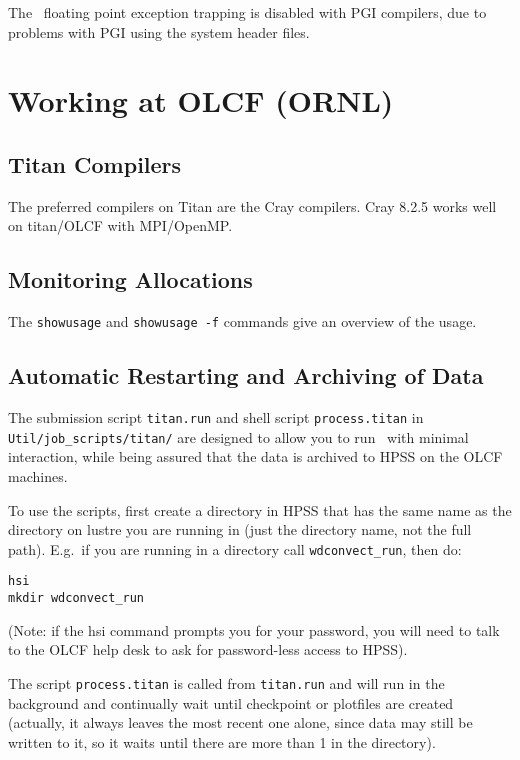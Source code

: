 The \boxlib\ floating point exception trapping is disabled with PGI compilers, due to 
problems with PGI using the system header files.



\section{Working at OLCF (ORNL)}

\subsection{Titan Compilers}

The preferred compilers on Titan are the Cray compilers.  
Cray 8.2.5 works well on titan/OLCF with MPI/OpenMP.


\subsection{Monitoring Allocations}

The {\tt showusage} and {\tt showusage -f} commands give an
overview of the usage.

\subsection{Automatic Restarting and Archiving of Data}

The submission script {\tt titan.run} and shell script
{\tt process.titan} in {\tt Util/job\_scripts/titan/}
are designed to allow you to run \maestro\ with minimal interaction,
while being assured that the data is archived to HPSS on the OLCF
machines.

To use the scripts, first create a directory in HPSS that has the same
name as the directory on lustre you are running in (just the directory
name, not the full path).  E.g.\ if you are running in a directory
call {\tt wdconvect\_run}, then do:
\begin{verbatim}
hsi
mkdir wdconvect_run
\end{verbatim}
(Note: if the hsi command prompts you for your password, you will need
to talk to the OLCF help desk to ask for password-less access to
HPSS).

The script {\tt process.titan} is called from {\tt titan.run} and will
run in the background and continually wait until checkpoint or
plotfiles are created (actually, it always leaves the most recent one
alone, since data may still be written to it, so it waits until there
are more than 1 in the directory).

